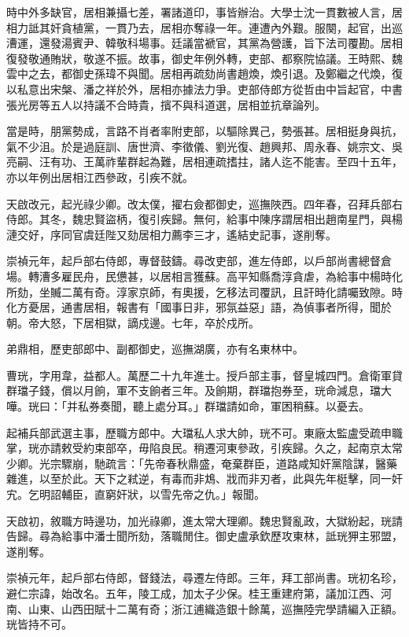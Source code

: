 \begin{pinyinscope}
時中外多缺官，居相兼攝七差，署諸道印，事皆辦治。大學士沈一貫數被人言，居相力詆其奸貪植黨，一貫乃去，居相亦奪祿一年。連遭內外艱。服闋，起官，出巡漕運，還發湯賓尹、韓敬科場事。廷議當褫官，其黨為營護，旨下法司覆勘。居相復發敬通賄狀，敬遂不振。故事，御史年例外轉，吏部、都察院協議。王時熙、魏雲中之去，都御史孫瑋不與聞。居相再疏劾尚書趙煥，煥引退。及鄭繼之代煥，復以私意出宋槃、潘之祥於外，居相亦據法力爭。吏部侍郎方從哲由中旨起官，中書張光房等五人以持議不合時貴，擯不與科道選，居相並抗章論列。

當是時，朋黨勢成，言路不肖者率附吏部，以驅除異己，勢張甚。居相挺身與抗，氣不少沮。於是過庭訓、唐世濟、李徵儀、劉光復、趙興邦、周永春、姚宗文、吳亮嗣、汪有功、王萬祚輩群起為難，居相連疏搘拄，諸人迄不能害。至四十五年，亦以年例出居相江西參政，引疾不就。

天啟改元，起光祿少卿。改太僕，擢右僉都御史，巡撫陜西。四年春，召拜兵部右侍郎。其冬，魏忠賢盜柄，復引疾歸。無何，給事中陳序謂居相出趙南星門，與楊漣交好，序同官虞廷陛又劾居相力薦李三才，遙結史記事，遂削奪。

崇禎元年，起戶部右侍郎，專督鼓鑄。尋改吏部，進左侍郎，以戶部尚書總督倉場。轉漕多雇民舟，民憊甚，以居相言獲蘇。高平知縣喬淳貪虐，為給事中楊時化所劾，坐贓二萬有奇。淳家京師，有奧援，乞移法司覆訊，且訐時化請囑致隙。時化方憂居，通書居相，報書有「國事日非，邪氛益惡」語，為偵事者所得，聞於朝。帝大怒，下居相獄，謫戍邊。七年，卒於戍所。

弟鼎相，歷吏部郎中、副都御史，巡撫湖廣，亦有名東林中。

曹珖，字用韋，益都人。萬歷二十九年進士。授戶部主事，督皇城四門。倉衛軍貸群璫子錢，償以月餉，軍不支餉者三年。及餉期，群璫抱券至，珖命減息，璫大嘩。珖曰：「并私券奏聞，聽上處分耳。」群璫請如命，軍困稍蘇。以憂去。

起補兵部武選主事，歷職方郎中。大璫私人求大帥，珖不可。東廠太監盧受疏申職掌，珖亦請敕受約束部卒，毋陷良民。稍遷河東參政，引疾歸。久之，起南京太常少卿。光宗驟崩，馳疏言：「先帝春秋鼎盛，奄棄群臣，道路咸知奸黨陰謀，醫藥雜進，以至於此。天下之弒逆，有毒而非鴆、戕而非刃者，此與先年梃擊，同一奸宄。乞明詔輔臣，直窮奸狀，以雪先帝之仇。」報聞。

天啟初，敘職方時邊功，加光祿卿，進太常大理卿。魏忠賢亂政，大獄紛起，珖請告歸。尋為給事中潘士聞所劾，落職閒住。御史盧承欽歷攻東林，詆珖狎主邪盟，遂削奪。

崇禎元年，起戶部右侍郎，督錢法，尋遷左侍郎。三年，拜工部尚書。珖初名珍，避仁宗諱，始改名。五年，陵工成，加太子少保。桂王重建府第，議加江西、河南、山東、山西田賦十二萬有奇；浙江逋織造銀十餘萬，巡撫陸完學請編入正額。珖皆持不可。


\end{pinyinscope}
